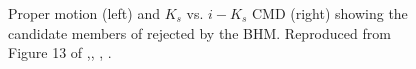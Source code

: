 \begin{figure}[ht!]
\begin{center}
\caption{Proper motion (left) and $K_s$ vs. $i-K_s$ CMD (right) showing the candidate members of \citet{Bouy2015} rejected by the BHM. Reproduced from Figure 13 of \citet{Olivares2017},\textit{}, , .}
\label{fig:rejecteds}
\end{center}
\end{figure}

\begin{figure}[htbp]
\begin{center}

\end{center}
\end{figure}
